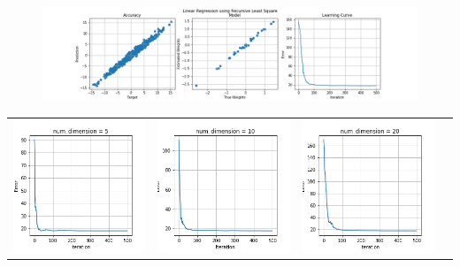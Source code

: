 \documentclass{article}
\begin{document}
\begin{figure}[H]
\begin{center}
\includegraphics[scale=0.35]{RLS.png}
\label{fig:rls}
\end{center}
\end{figure}

\begin{table}[H]
\begin{tabular}{cccc}
\includegraphics[scale=0.3]{RLS-5D.png} &
\includegraphics[scale=0.3]{RLS-10D.png} &
\includegraphics[scale=0.3]{RLS-20D.png} &

\end{tabular}
\end{table}
\end{document}
